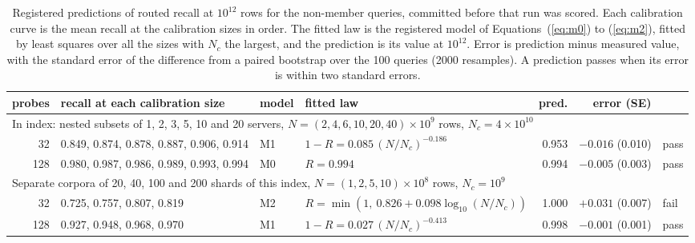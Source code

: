 \documentclass[sigconf, nonacm]{acmart}
\begin{document}
\begin{table}[t]
\caption{Registered predictions of routed recall at $10^{12}$ rows for the non-member queries,
committed before that run was scored. Each calibration curve is the mean recall at the calibration
sizes in order. The fitted law is the registered model of Equations~(\ref{eq:m0}) to
(\ref{eq:m2}), fitted by least squares over all the sizes with $N_c$ the largest, and the
prediction is its value at $10^{12}$. Error is prediction minus measured value, with the standard
error of the difference from a paired bootstrap over the 100 queries (2000 resamples). A prediction
passes when its error is within two standard errors.}
\label{tab:transfer}
\centering
\footnotesize
\setlength{\tabcolsep}{3.5pt}
\begin{tabular}{rlllrrl}
\toprule
probes & recall at each calibration size & model & fitted law & pred. & error (SE) & \\
\midrule
\multicolumn{7}{l}{In index: nested subsets of 1, 2, 3, 5, 10 and 20 servers, $N = (2, 4, 6, 10, 20, 40)\times10^{9}$ rows, $N_c = 4\times10^{10}$} \\
32  & 0.849, 0.874, 0.878, 0.887, 0.906, 0.914 & M1 & $1-R = 0.085\,(N/N_c)^{-0.186}$ & 0.953 & $-0.016$ (0.010) & pass \\
128 & 0.980, 0.987, 0.986, 0.989, 0.993, 0.994 & M0 & $R = 0.994$ & 0.994 & $-0.005$ (0.003) & pass \\
\midrule
\multicolumn{7}{l}{Separate corpora of 20, 40, 100 and 200 shards of this index, $N = (1, 2, 5, 10)\times10^{8}$ rows, $N_c = 10^{9}$} \\
32  & 0.725, 0.757, 0.807, 0.819 & M2 & $R = \min(1,\ 0.826 + 0.098\log_{10}(N/N_c))$ & 1.000 & $+0.031$ (0.007) & fail \\
128 & 0.927, 0.948, 0.968, 0.970 & M1 & $1-R = 0.027\,(N/N_c)^{-0.413}$ & 0.998 & $-0.001$ (0.001) & pass \\
\bottomrule
\end{tabular}
\end{table}
\end{document}
